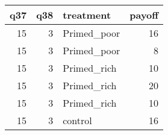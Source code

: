 
\begin{tabular}{r|r|l|r}
\hline
q37 & q38 & treatment & payoff\\
\hline
15 & 3 & Primed\_poor & 16\\
\hline
15 & 3 & Primed\_poor & 8\\
\hline
15 & 3 & Primed\_rich & 10\\
\hline
15 & 3 & Primed\_rich & 20\\
\hline
15 & 3 & Primed\_rich & 10\\
\hline
15 & 3 & control & 16\\
\hline
\end{tabular}
